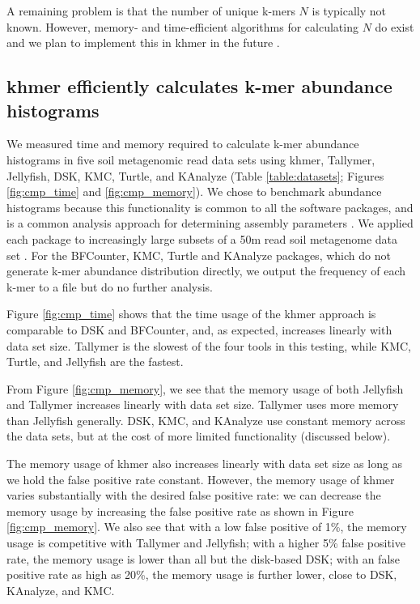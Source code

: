 \documentclass[10pt]{article}
\begin{document}
A remaining problem is that the number of unique k-mers $N$ is
typically not known.  However, memory- and time-efficient algorithms
for calculating $N$ do exist and we plan to implement this in
khmer in the future \cite{flajolet2008hyperloglog}.

\subsection*{khmer efficiently calculates k-mer abundance histograms}

We measured time and memory required to calculate k-mer abundance
histograms in five soil metagenomic read data sets using khmer,
Tallymer, Jellyfish, DSK, KMC, Turtle, and KAnalyze (Table
\ref{table:datasets}; Figures \ref{fig:cmp_time} and
\ref{fig:cmp_memory}).  We chose to benchmark abundance histograms
because this functionality is common to all the software packages, and
is a common analysis approach for determining assembly parameters
\cite{Chikhi:2014aa}.  We applied each package to increasingly large
subsets of a 50m read soil metagenome data set \cite{Howe2012}. For
the BFCounter, KMC, Turtle and KAnalyze packages, which do not
generate k-mer abundance distribution directly, we output the
frequency of each k-mer to a file but do no further analysis.

Figure \ref{fig:cmp_time} shows that the time usage of the khmer
approach is comparable to DSK and BFCounter, and, as expected,
increases linearly with data set size. Tallymer is the slowest of the
four tools in this testing, while KMC, Turtle, and Jellyfish are
the fastest.

From Figure \ref{fig:cmp_memory}, we see that the memory usage of both
Jellyfish and Tallymer increases linearly with data set size. Tallymer
uses more memory than Jellyfish generally.  DSK, KMC, and KAnalyze use
constant memory across the data sets, but at the cost of more limited
functionality (discussed below).


The memory usage of khmer also increases linearly with data set size
as long as we hold the false positive rate constant.  However, the
memory usage of khmer varies substantially with the desired false
positive rate: we can decrease the memory usage by increasing the
false positive rate as shown in Figure \ref{fig:cmp_memory}.  We also
see that with a low false positive of 1\%, the memory usage is
competitive with Tallymer and Jellyfish; with a higher 5\% false
positive rate, the memory usage is lower than all but the disk-based
DSK; with an false positive rate as high as 20\%, the memory usage is
further lower, close to DSK, KAnalyze, and KMC.
\end{document}
